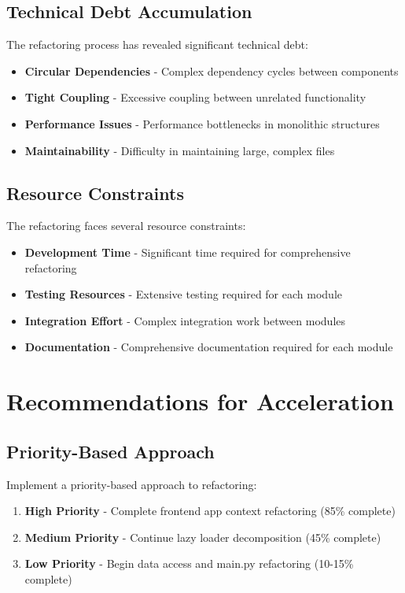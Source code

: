 \documentclass[11pt]{article}
\begin{document}
\subsection{Technical Debt Accumulation}

The refactoring process has revealed significant technical debt:

\begin{itemize}
\item \textbf{Circular Dependencies} - Complex dependency cycles between components
\item \textbf{Tight Coupling} - Excessive coupling between unrelated functionality
\item \textbf{Performance Issues} - Performance bottlenecks in monolithic structures
\item \textbf{Maintainability} - Difficulty in maintaining large, complex files
\end{itemize}

\subsection{Resource Constraints}

The refactoring faces several resource constraints:

\begin{itemize}
\item \textbf{Development Time} - Significant time required for comprehensive refactoring
\item \textbf{Testing Resources} - Extensive testing required for each module
\item \textbf{Integration Effort} - Complex integration work between modules
\item \textbf{Documentation} - Comprehensive documentation required for each module
\end{itemize}

\section{Recommendations for Acceleration}

\subsection{Priority-Based Approach}

Implement a priority-based approach to refactoring:

\begin{enumerate}
\item \textbf{High Priority} - Complete frontend app context refactoring (85\% complete)
\item \textbf{Medium Priority} - Continue lazy loader decomposition (45\% complete)
\item \textbf{Low Priority} - Begin data access and main.py refactoring (10-15\% complete)
\end{enumerate}
\end{document}

